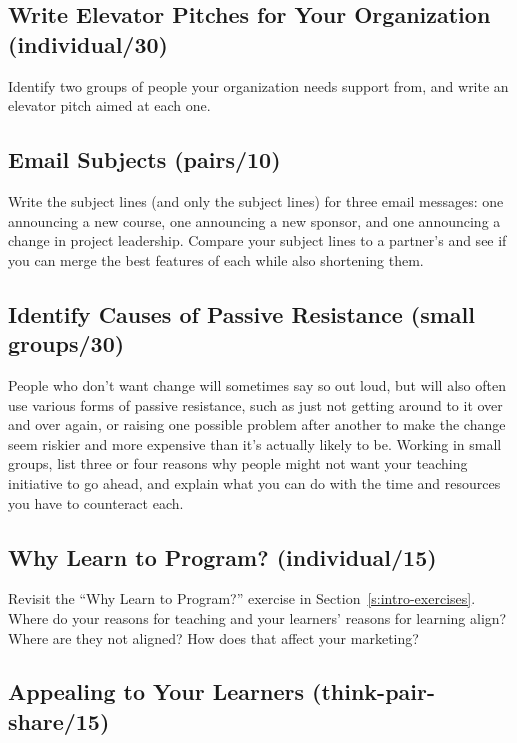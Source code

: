 \subsection{Write Elevator Pitches for Your Organization (individual/30)}\label{write-elevator-pitches-for-your-organization-individual30}

Identify two groups of people your organization needs support from, and
write an elevator pitch aimed at each one.

\subsection{Email Subjects (pairs/10)}\label{email-subjects-pairs10}

Write the subject lines (and only the subject lines) for three email
messages: one announcing a new course, one announcing a new sponsor, and
one announcing a change in project leadership. Compare your subject
lines to a partner's and see if you can merge the best features of each
while also shortening them.

\subsection{Identify Causes of Passive Resistance (small groups/30)}\label{identify-causes-of-passive-resistance-small-groups30}

People who don't want change will sometimes say so out loud, but will
also often use various forms of passive resistance, such as just not
getting around to it over and over again, or raising one possible
problem after another to make the change seem riskier and more expensive
than it's actually likely to be. Working in small groups, list three or
four reasons why people might not want your teaching initiative to go
ahead, and explain what you can do with the time and resources you have
to counteract each.

\subsection{Why Learn to Program? (individual/15)}\label{why-learn-to-program-individual15}

Revisit the ``Why Learn to Program?'' exercise in
Section~\ref{s:intro-exercises}. Where do your reasons for teaching and
your learners' reasons for learning align? Where are they not aligned?
How does that affect your marketing?

\subsection{Appealing to Your Learners (think-pair-share/15)}\label{appealing-to-your-learners-think-pair-share15}

